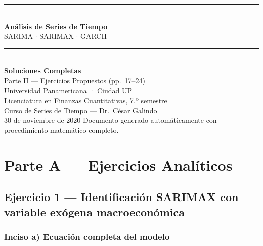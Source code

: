\documentclass[12pt,a4paper]{article}
\begin{document}
\begin{titlepage}
\centering
\vspace*{2cm}
{\color{azulup}\rule{\linewidth}{1pt}}\\[0.5em]
{\LARGE\bfseries\color{azulup} Análisis de Series de Tiempo}\\[0.3em]
{\large SARIMA $\cdot$ SARIMAX $\cdot$ GARCH}\\[0.3em]
{\color{azulup}\rule{\linewidth}{1pt}}\\[1.5em]
{\Large\bfseries Soluciones Completas}\\[0.5em]
{\large Parte II — Ejercicios Propuestos (pp.\ 17--24)}\\[2em]
{\large Universidad Panamericana · Ciudad UP}\\[0.5em]
{\normalsize Licenciatura en Finanzas Cuantitativas, 7.º semestre}\\[0.5em]
{\normalsize Curso de Series de Tiempo — Dr.\ César Galindo}\\[3em]
{\normalsize 30 de noviembre de 2020}
\vfill
{\small Documento generado automáticamente con procedimiento matemático completo.}
\end{titlepage}

\tableofcontents
\clearpage

\section{Parte A — Ejercicios Analíticos}

\subsection{Ejercicio 1 — Identificación SARIMAX con variable exógena macroeconómica}

\subsubsection*{Inciso a) Ecuación completa del modelo}
\end{document}
